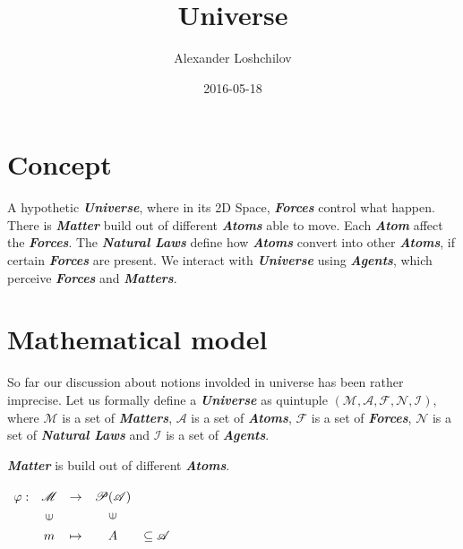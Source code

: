 \documentclass[a4paper]{article}
\title{Universe}
\author{Alexander Loshchilov}
\date{2016-05-18}
\begin{document}
\maketitle



\newpage

\tableofcontents


\newpage

\section{Concept}

A hypothetic \textit{\textbf{Universe}}, where in its 2D Space, \textit{\textbf{Forces}} control what happen. There is \textit{\textbf{Matter}} build out of different \textit{\textbf{Atoms}} able to move. Each \textit{\textbf{Atom}} affect the \textit{\textbf{Forces}}. The \textit{\textbf{Natural Laws}} define how \textit{\textbf{Atoms}} convert into other \textit{\textbf{Atoms}}, if certain \textit{\textbf{Forces}} are present. We interact with \textit{\textbf{Universe}} using \textit{\textbf{Agents}}, which perceive \textit{\textbf{Forces}} and \textit{\textbf{Matters}}.

\newpage

\section{Mathematical model} 

So far our discussion about notions involded in universe has been rather imprecise.
Let us formally define a \textit{\textbf{Universe}} as quintuple
$ (\mathscr{M}, \mathscr{A}, \mathscr{F}, \mathscr{N}, \mathscr{I}) $,
where $ \mathscr{M} $ is a set of \textit{\textbf{Matters}}, $ \mathscr{A} $ is a set of \textit{\textbf{Atoms}},
$ \mathscr{F} $ is a set of \textit{\textbf{Forces}}, $ \mathscr{N} $ is a set of \textit{\textbf{Natural Laws}} and
$ \mathscr{I} $ is a set of \textit{\textbf{Agents}}.

\textit{\textbf{Matter}} is build out of different \textit{\textbf{Atoms}}.

$\renewcommand{\arraystretch}{1.3}
\begin{array}[c]{ccccc}
\varphi:&\mathscr{M}&\rightarrow&\mathscr{P}(\mathscr{A})\\
&\rotatebox[origin=c]{90}{{$\in$}}&&\rotatebox{90}{$\in$}&\\
&m&\mapsto& A &\subseteq \mathscr{A}
\end{array}$
\end{document}
